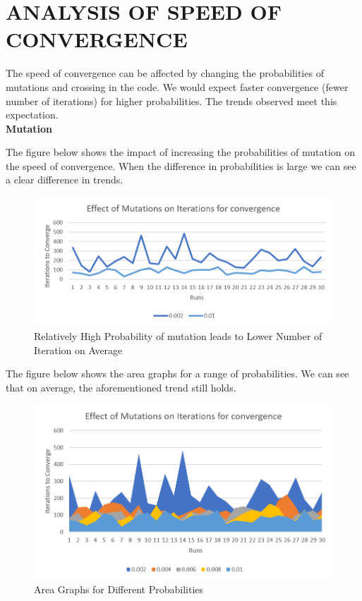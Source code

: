 \documentclass[twoside,twocolumn]{article}
\begin{document}
\section{ANALYSIS OF SPEED OF CONVERGENCE}

The speed of convergence can be  affected by changing the probabilities of mutations and crossing in the code. We would expect faster convergence (fewer number of iterations) for higher probabilities. The trends observed meet this expectation. \\

\textbf{Mutation}

The figure below shows the impact of increasing the probabilities of mutation on the speed of convergence. When the difference in probabilities is large we can see a clear difference in trends.
\vspace{-4mm}
\begin{figure}[h]
\centering
\includegraphics[height=4 cm\textwidth]{images/mutations comaprison.png}
\caption{Relatively High Probability of mutation leads to Lower Number of Iteration on Average}
\end{figure}

The figure below shows the area graphs for a range of probabilities. We can see that on average, the aforementioned trend still holds.
\vspace{-4mm}
\begin{figure}[h]
\centering
\includegraphics[height=6 cm\textwidth]{images/mutationsArea.png}
\caption{Area Graphs for Different Probabilities}
\end{figure}
\end{document}
